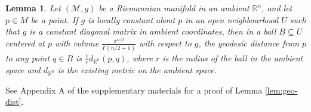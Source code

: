 \documentclass[12pt]{article}
\newtheorem{lem}{Lemma}
\begin{document}
\begin{lem}\label{lem:geo-dist1}
Let $(\mathcal{M}, g)$ be a Riemannian manifold in an ambient $\mathbb{R}^n$, and let $p \in M$ be a point. If $g$ is locally constant about $p$ in an open neighbourhood $U$ such that $g$ is a constant diagonal matrix in ambient coordinates, then in a ball $B\subseteq U$ centered at $p$ with volume $\frac{\pi^{n/2}}{\Gamma(n/2 + 1)}$ with respect to $g$, the geodesic distance from $p$ to any point $q\in B$ is $\frac{1}{r} d_{\mathbb{R}^n}(p, q)$, where $r$ is the radius of the ball in the ambient space and $d_{\mathbb{R}^n}$ is the existing metric on the ambient space.
\end{lem}

See Appendix A of the supplementary materials for a proof of Lemma \ref{lem:geo-dist}.

\end{document}
